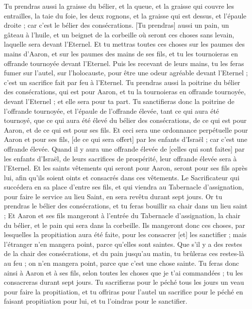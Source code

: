 \begin{multicols}{2}
Tu prendras aussi la graisse du bélier, et la queue, et la graisse qui couvre les entrailles, la taie du foie, les deux rognons, et la graisse qui est dessus, et l'épaule droite ; car c'est le bélier des consécrations.
[Tu prendras] aussi un pain, un gâteau à l'huile, et un beignet de la corbeille où seront ces choses sans levain, laquelle sera devant l'Eternel.
Et tu mettras toutes ces choses sur les paumes des mains d'Aaron, et sur les paumes des mains de ses fils, et tu les tournoieras en offrande tournoyée devant l'Eternel.
Puis les recevant de leurs mains, tu les feras fumer sur l'autel, sur l'holocauste, pour être une odeur agréable devant l'Eternel ; c'est un sacrifice fait par feu à l'Eternel.
Tu prendras aussi la poitrine du bélier des consécrations, qui est pour Aaron, et tu la tournoieras en offrande tournoyée, devant l'Eternel ; et elle sera pour ta part.
Tu sanctifieras donc la poitrine de l'offrande tournoyée, et l'épaule de l'offrande élevée, tant ce qui aura été tournoyé, que ce qui aura été élevé du bélier des consécrations, de ce qui est pour Aaron, et de ce qui est pour ses fils.
Et ceci sera une ordonnance perpétuelle pour Aaron et pour ses fils, [de ce qui sera offert] par les enfants d'Israël ; car c'est une offrande élevée. Quand il y aura une offrande élevée de [celles qui sont faites] par les enfants d'Israël, de leurs sacrifices de prospérité, leur offrande élevée sera à l'Eternel.
Et les saints vêtements qui seront pour Aaron, seront pour ses fils après lui, afin qu'ils soient oints et consacrés dans ces vêtements.
Le Sacrificateur qui succédera en sa place d'entre ses fils, et qui viendra au Tabernacle d'assignation, pour faire le service au lieu Saint, en sera revêtu durant sept jours.
Or tu prendras le bélier des consécrations, et tu feras bouillir sa chair dans un lieu saint ;
Et Aaron et ses fils mangeront à l'entrée du Tabernacle d'assignation, la chair du bélier, et le pain qui sera dans la corbeille.
Ils mangeront donc ces choses, par lesquelles la propitiation aura été faite, pour les consacrer [et] les sanctifier ; mais l'étranger n'en mangera point, parce qu'elles sont saintes.
Que s'il y a des restes de la chair des consécrations, et du pain jusqu’au matin, tu brûleras ces restes-là au feu ; on n'en mangera point, parce que c'est une chose sainte.
Tu feras donc ainsi à Aaron et à ses fils, selon toutes les choses que je t'ai commandées ; tu les consacreras durant sept jours.
Tu sacrifieras pour le péché tous les jours un veau pour faire la propitiation, et tu offriras pour l'autel un sacrifice pour le péché en faisant propitiation pour lui, et tu l'oindras pour le sanctifier.

\end{multicols}
